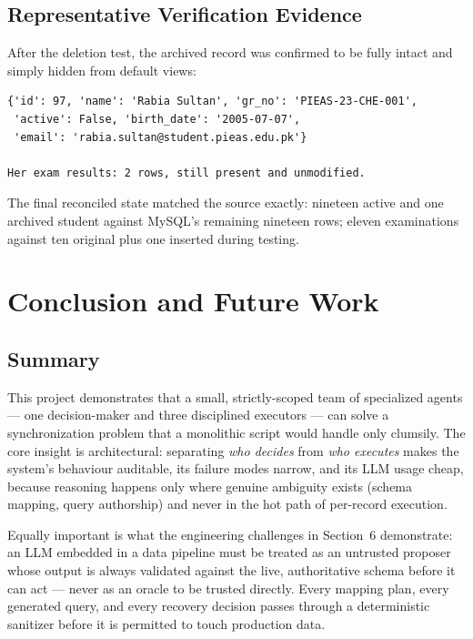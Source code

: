 \documentclass[11pt,a4paper]{article}
\begin{document}
\subsection{Representative Verification Evidence}
After the deletion test, the archived record was confirmed to be fully intact and simply hidden from default views:
\begin{lstlisting}[caption={A student archived, not destroyed, after her row vanished from PIEAS}]
{'id': 97, 'name': 'Rabia Sultan', 'gr_no': 'PIEAS-23-CHE-001',
 'active': False, 'birth_date': '2005-07-07',
 'email': 'rabia.sultan@student.pieas.edu.pk'}

Her exam results: 2 rows, still present and unmodified.
\end{lstlisting}

The final reconciled state matched the source exactly: nineteen active and one archived student against MySQL's remaining nineteen rows; eleven examinations against ten original plus one inserted during testing.

\newpage
\section{Conclusion and Future Work}

\subsection{Summary}
This project demonstrates that a small, strictly-scoped team of specialized agents --- one decision-maker and three disciplined executors --- can solve a synchronization problem that a monolithic script would handle only clumsily. The core insight is architectural: separating \emph{who decides} from \emph{who executes} makes the system's behaviour auditable, its failure modes narrow, and its LLM usage cheap, because reasoning happens only where genuine ambiguity exists (schema mapping, query authorship) and never in the hot path of per-record execution.

Equally important is what the engineering challenges in Section~6 demonstrate: an LLM embedded in a data pipeline must be treated as an untrusted proposer whose output is always validated against the live, authoritative schema before it can act --- never as an oracle to be trusted directly. Every mapping plan, every generated query, and every recovery decision passes through a deterministic sanitizer before it is permitted to touch production data.
\end{document}
